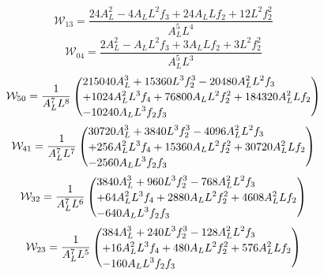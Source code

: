 \documentclass[11pt,a4paper]{article}
\begin{document}
\begin{equation}
\mathcal W_{13}=\frac{24 A_{L}^{2} - 4 A_{L} L^{2} f_{3} + 24 A_{L} L f_{2} + 12 L^{2} f_{2}^{2}}{A_{L}^{5} L^{4}}
\label{eq:cat-local-W-1-3}
\end{equation}
\begin{equation}
\mathcal W_{04}=\frac{2 A_{L}^{2} - A_{L} L^{2} f_{3} + 3 A_{L} L f_{2} + 3 L^{2} f_{2}^{2}}{A_{L}^{5} L^{3}}
\label{eq:cat-local-W-0-4}
\end{equation}
\begin{equation}
\mathcal W_{50}=\frac{1}{A_{L}^{7} L^{8}}\left(\vcenter{\hbox{\shortstack[l]{$\displaystyle 215040 A_{L}^{3} + 15360 L^{3} f_{2}^{3} - 20480 A_{L}^{2} L^{2} f_{3}$\\
$\displaystyle + 1024 A_{L}^{2} L^{3} f_{4} + 76800 A_{L} L^{2} f_{2}^{2} + 184320 A_{L}^{2} L f_{2}$\\
$\displaystyle - 10240 A_{L} L^{3} f_{2} f_{3}$}}}\right)
\label{eq:cat-local-W-5-0}
\end{equation}
\begin{equation}
\mathcal W_{41}=\frac{1}{A_{L}^{7} L^{7}}\left(\vcenter{\hbox{\shortstack[l]{$\displaystyle 30720 A_{L}^{3} + 3840 L^{3} f_{2}^{3} - 4096 A_{L}^{2} L^{2} f_{3}$\\
$\displaystyle + 256 A_{L}^{2} L^{3} f_{4} + 15360 A_{L} L^{2} f_{2}^{2} + 30720 A_{L}^{2} L f_{2}$\\
$\displaystyle - 2560 A_{L} L^{3} f_{2} f_{3}$}}}\right)
\label{eq:cat-local-W-4-1}
\end{equation}
\begin{equation}
\mathcal W_{32}=\frac{1}{A_{L}^{7} L^{6}}\left(\vcenter{\hbox{\shortstack[l]{$\displaystyle 3840 A_{L}^{3} + 960 L^{3} f_{2}^{3} - 768 A_{L}^{2} L^{2} f_{3}$\\
$\displaystyle + 64 A_{L}^{2} L^{3} f_{4} + 2880 A_{L} L^{2} f_{2}^{2} + 4608 A_{L}^{2} L f_{2}$\\
$\displaystyle - 640 A_{L} L^{3} f_{2} f_{3}$}}}\right)
\label{eq:cat-local-W-3-2}
\end{equation}
\begin{equation}
\mathcal W_{23}=\frac{1}{A_{L}^{7} L^{5}}\left(\vcenter{\hbox{\shortstack[l]{$\displaystyle 384 A_{L}^{3} + 240 L^{3} f_{2}^{3} - 128 A_{L}^{2} L^{2} f_{3}$\\
$\displaystyle + 16 A_{L}^{2} L^{3} f_{4} + 480 A_{L} L^{2} f_{2}^{2} + 576 A_{L}^{2} L f_{2}$\\
$\displaystyle - 160 A_{L} L^{3} f_{2} f_{3}$}}}\right)
\label{eq:cat-local-W-2-3}
\end{equation}
\end{document}
